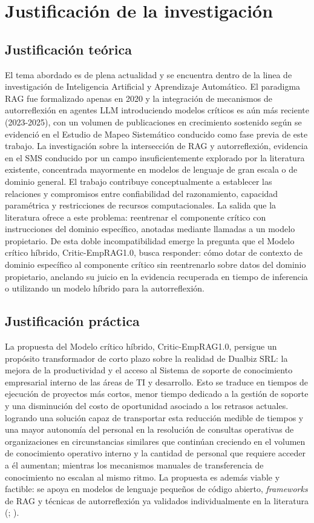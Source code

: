 \section{Justificación de la investigación}

\subsection*{Justificación teórica}
El tema abordado es de plena actualidad y se encuentra dentro de la linea de investigación de Inteligencia Artificial y Aprendizaje Automático. El paradigma RAG fue formalizado apenas en 2020 y la integración de mecanismos de autorreflexión en agentes LLM introduciendo modelos críticos es aún más reciente (2023-2025), con un volumen de publicaciones en crecimiento sostenido según se evidenció en el Estudio de Mapeo Sistemático conducido como fase previa de este trabajo. La investigación sobre la intersección de RAG y autorreflexión, evidencia en el SMS conducido por {\textcite{Alcides2026}} un campo insuficientemente explorado por la literatura existente, concentrada mayormente en modelos de lenguaje de gran escala o de dominio general. El trabajo contribuye conceptualmente a establecer las relaciones y compromisos entre confiabilidad del razonamiento, capacidad paramétrica y restricciones de recursos computacionales. La salida que la literatura ofrece a este problema: reentrenar el componente crítico con instrucciones del dominio específico, anotadas mediante llamadas a un modelo propietario. De esta doble incompatibilidad emerge la pregunta que el Modelo crítico híbrido, Critic-EmpRAG1.0, busca responder: cómo dotar de contexto de dominio específico al componente crítico sin reentrenarlo sobre datos del dominio propietario, anclando su juicio en la evidencia recuperada en tiempo de inferencia o utilizando un modelo híbrido para la autorreflexión.

\subsection*{Justificación práctica}

La propuesta del Modelo crítico híbrido, Critic-EmpRAG1.0, persigue un propósito transformador de corto plazo sobre la realidad de Dualbiz SRL: la mejora de la productividad y el acceso al Sistema de soporte de conocimiento empresarial interno de las áreas de TI y desarrollo. Esto se traduce en tiempos de ejecución de proyectos más cortos, menor tiempo dedicado a la gestión de soporte y una disminución del costo de oportunidad asociado a los retrasos actuales. logrando una solución capaz de transportar esta reducción medible de tiempos y una mayor autonomía del personal en la resolución de consultas operativas de organizaciones en circunstancias similares que continúan creciendo en el volumen de conocimiento operativo interno y la cantidad de personal que requiere acceder a él aumentan; mientras los mecanismos manuales de transferencia de conocimiento no escalan al mismo ritmo. La propuesta es además viable y factible: se apoya en modelos de lenguaje pequeños de código abierto, \textit{frameworks} de RAG y técnicas de autorreflexión ya validados individualmente en la literatura (\cite{Shinn2023_Reflexion}; \cite{Asai2024_Selfrag}). 

